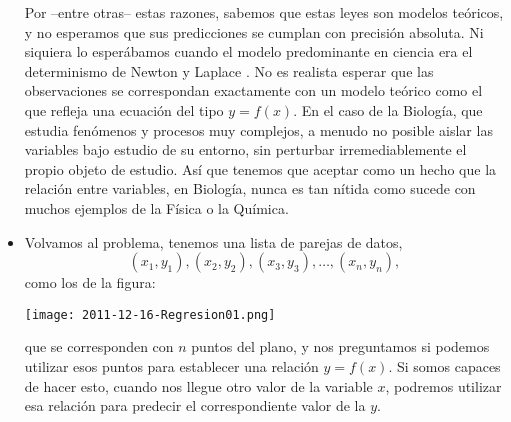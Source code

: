 \begin{itemize}
        Por --entre otras-- estas razones, sabemos que estas leyes son modelos teóricos, y no esperamos que sus predicciones se cumplan con precisión absoluta. Ni siquiera lo esperábamos cuando el modelo predominante en ciencia era el determinismo de Newton y Laplace
        . No es realista esperar que las observaciones se correspondan exactamente con un modelo teórico como el que refleja una ecuación del tipo $y=f(x)$. En el caso de la Biología, que estudia fenómenos y procesos muy complejos, a menudo no posible aislar las variables bajo estudio de su entorno, sin perturbar irremediablemente el propio objeto de estudio. Así que tenemos que aceptar como un hecho que la relación entre variables, en Biología, nunca es tan nítida como sucede con muchos ejemplos de la Física o la Química.

    \item Volvamos al problema, tenemos una lista de parejas de datos,
    \[(x_1,y_1),(x_2,y_2),(x_3,y_3),\ldots,(x_n,y_n),\]
    como los de la figura:
    \begin{center}
    \texttt{[image: 2011-12-16-Regresion01.png]}
    \end{center}

    que se corresponden con $n$ puntos del plano, y nos preguntamos si podemos utilizar esos puntos para establecer una relación $y=f(x)$.  Si somos capaces de hacer esto, cuando nos llegue otro valor de la variable $x$, podremos utilizar esa relación para predecir el correspondiente valor de la $y$.


\end{itemize}

